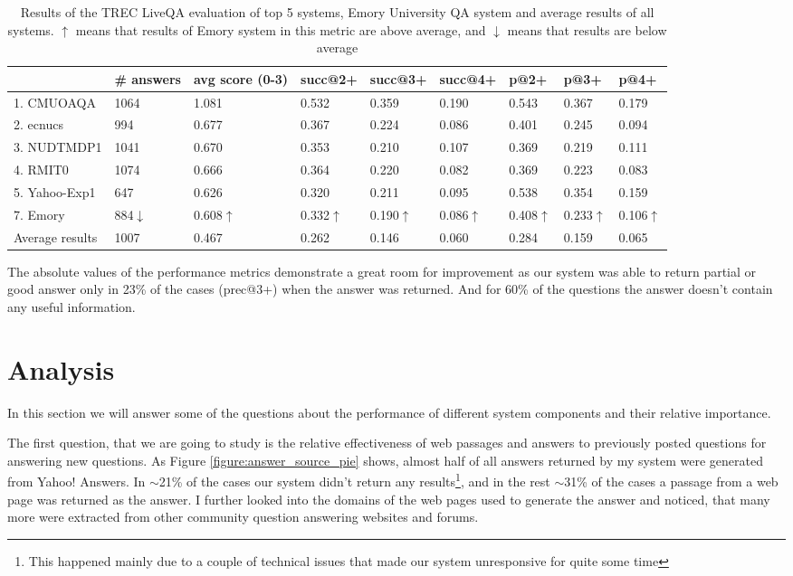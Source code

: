\documentclass[]{article}
\begin{document}
\begin{table}
\caption{Results of the TREC LiveQA evaluation of top 5 systems, Emory University QA system and average results of all systems. $\uparrow$ means that results of Emory system in this metric are above average, and $\downarrow$ means that results are below average}
\label{table:liveqa-results}
\begin{tabular}{|p{2.5cm}|p{1.7cm}|p{1.3cm}|p{1.3cm}|p{1.3cm}|p{1.3cm}|p{1cm}|p{1cm}|p{1cm}|}
\hline
 & \# answers & avg score (0-3) & succ@2+ & succ@3+ & succ@4+ & p@2+ &  p@3+ & p@4+ \\
\hline
1. CMUOAQA & 1064 & 1.081 & 0.532 & 0.359 & 0.190 & 0.543 & 0.367 & 0.179 \\
2. ecnucs & 994 & 0.677 & 0.367 & 0.224 & 0.086 & 0.401 & 0.245 & 0.094\\
3. NUDTMDP1 & 1041 & 0.670 & 0.353 & 0.210 & 0.107 & 0.369 & 0.219 & 0.111\\
4. RMIT0 & 1074 & 0.666 & 0.364 & 0.220 & 0.082 & 0.369 & 0.223 & 0.083\\
5. Yahoo-Exp1 & 647 & 0.626 & 0.320 & 0.211 & 0.095 & 0.538 & 0.354 & 0.159\\
\hline
7. Emory & 884$\downarrow$ & 0.608$\uparrow$ & 0.332$\uparrow$ & 0.190$\uparrow$ & 0.086$\uparrow$ & 0.408$\uparrow$ & 0.233$\uparrow$ & 0.106$\uparrow$\\
\hline
Average results & 1007 & 0.467 & 0.262 & 0.146 & 0.060 & 0.284 & 0.159 & 0.065\\
\hline
\end{tabular}
\end{table}

The absolute values of the performance metrics demonstrate a great room for improvement as our system was able to return partial or good answer only in 23\% of the cases (prec@3+) when the answer was returned.
And for 60\% of the questions the answer doesn't contain any useful information.

\section{Analysis}

In this section we will answer some of the questions about the performance of different system components and their relative importance.

The first question, that we are going to study is the relative effectiveness of web passages and answers to previously posted questions for answering new questions.
As Figure \ref{figure:answer_source_pie} shows, almost half of all answers returned by my system were generated from Yahoo! Answers.
In $\sim$21\% of the cases our system didn't return any results\footnote{This happened mainly due to a couple of technical issues that made our system unresponsive for quite some time}, and in the rest $\sim$31\% of the cases a passage from a web page was returned as the answer.
I further looked into the domains of the web pages used to generate the answer and noticed, that many more were extracted from other community question answering websites and forums.
\end{document}
